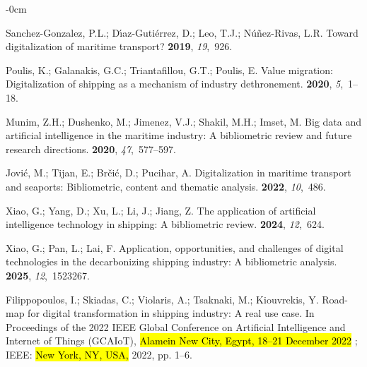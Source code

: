 \documentclass[jmse,review,accept,pdftex,moreauthors]{Definitions/mdpi}
\begin{document}
\begin{adjustwidth}{-\extralength}{0cm}
\begin{thebibliography}{999}
Sanchez-Gonzalez, P.L.; D{\'\i}az-Guti{\'e}rrez, D.; Leo, T.J.;
  N{\'u}{\~n}ez-Rivas, L.R.
\newblock Toward digitalization of maritime transport?
 {\bf 2019}, {\em 19},~926.

Poulis, K.; Galanakis, G.C.; Triantafillou, G.T.; Poulis, E.
\newblock Value migration: Digitalization of shipping as a mechanism of
  industry dethronement.
 {\bf 2020}, {\em 5},~1--18.

Munim, Z.H.; Dushenko, M.; Jimenez, V.J.; Shakil, M.H.; Imset, M.
\newblock Big data and artificial intelligence in the maritime industry: A
  bibliometric review and future research directions.
 {\bf 2020}, {\em 47},~577--597.

Jovi{\'c}, M.; Tijan, E.; Br{\v{c}}i{\'c}, D.; Pucihar, A.
\newblock Digitalization in maritime transport and seaports: Bibliometric,
  content and thematic analysis.
 {\bf 2022}, {\em
  10},~486.

Xiao, G.; Yang, D.; Xu, L.; Li, J.; Jiang, Z.
\newblock The application of artificial intelligence technology in shipping: A
  bibliometric review.
 {\bf 2024}, {\em
  12},~624.

Xiao, G.; Pan, L.; Lai, F.
\newblock Application, opportunities, and challenges of digital technologies in
  the decarbonizing shipping industry: A bibliometric analysis.
 {\bf 2025}, {\em 12},~1523267.

Filippopoulos, I.; Skiadas, C.; Violaris, A.; Tsaknaki, M.; Kiouvrekis, Y.
\newblock Road-map for digital transformation in shipping industry: A real use
  case.
\newblock In Proceedings of the 2022 IEEE Global Conference on Artificial
  Intelligence and Internet of Things (GCAIoT), \hl{Alamein New City, Egypt, 18--21 December 2022}%
;  IEEE: \hl{New York, NY, USA,}  2022, pp. 1--6.


\end{thebibliography}
\end{adjustwidth}
\end{document}
